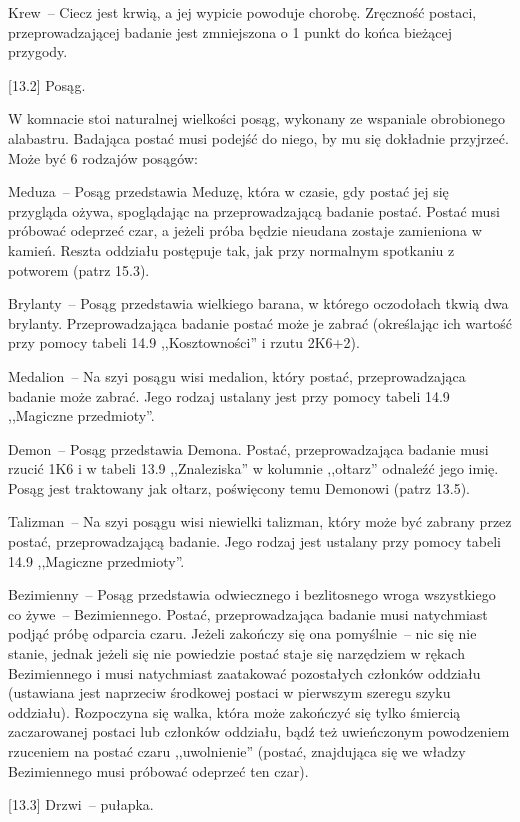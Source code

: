 Krew~-- Ciecz jest krwią, a jej wypicie powoduje chorobę.
Zręczność postaci, przeprowadzającej badanie jest zmniejszona o 1 punkt do końca bieżącej przygody.

[13.2] Posąg.

W komnacie stoi naturalnej wielkości posąg, wykonany ze wspaniale obrobionego alabastru.
Badająca postać musi podejść do niego, by mu się dokładnie przyjrzeć.
Może być 6 rodzajów posągów:

Meduza~-- Posąg przedstawia Meduzę, która w czasie, gdy postać jej się przygląda ożywa, spoglądając na przeprowadzającą badanie postać.
Postać musi próbować odeprzeć czar, a jeżeli próba będzie nieudana zostaje zamieniona w kamień.
Reszta oddziału postępuje tak, jak przy normalnym spotkaniu z potworem (patrz 15.3).

Brylanty~-- Posąg przedstawia wielkiego barana, w którego oczodołach tkwią dwa brylanty.
Przeprowadzająca badanie postać może je zabrać (określając ich wartość przy pomocy tabeli 14.9 ,,Kosztowności'' i rzutu 2K6+2).

Medalion~-- Na szyi posągu wisi medalion, który postać, przeprowadzająca badanie może zabrać.
Jego rodzaj ustalany jest przy pomocy tabeli 14.9 ,,Magiczne przedmioty''.

Demon~-- Posąg przedstawia Demona.
Postać, przeprowadzająca badanie musi rzucić 1K6 i w tabeli 13.9 ,,Znaleziska'' w kolumnie ,,ołtarz'' odnaleźć jego imię.
Posąg jest traktowany jak ołtarz, poświęcony temu Demonowi (patrz 13.5).

Talizman~-- Na szyi posągu wisi niewielki talizman, który może być zabrany przez postać, przeprowadzającą badanie.
Jego rodzaj jest ustalany przy pomocy tabeli 14.9 ,,Magiczne przedmioty''.

Bezimienny~-- Posąg przedstawia odwiecznego i bezlitosnego wroga wszystkiego co żywe~-- Bezimiennego.
Postać, przeprowadzająca badanie musi natychmiast podjąć próbę odparcia czaru.
Jeżeli zakończy się ona pomyślnie~-- nic się nie stanie, jednak jeżeli się nie powiedzie postać staje się narzędziem w rękach Bezimiennego i musi natychmiast zaatakować pozostałych członków oddziału (ustawiana jest naprzeciw środkowej postaci w pierwszym szeregu szyku oddziału).
Rozpoczyna się walka, która może zakończyć się tylko śmiercią zaczarowanej postaci lub członków oddziału, bądź też uwieńczonym powodzeniem rzuceniem na postać czaru ,,uwolnienie'' (postać, znajdująca się we władzy Bezimiennego musi próbować odeprzeć ten czar).

[13.3] Drzwi~-- pułapka.

